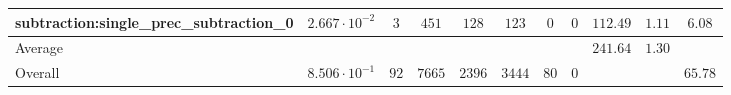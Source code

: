 \begin{tabular}{|l|c|c|c|c|c|c|c|c|c|c|}
subtraction:single\_prec\_subtraction\_0         & $ 2.667 \cdot 10^{-2} $ & $ 3      $ & $ 451  $ & $ 128  $ & $ 123   $ & $ 0  $ & $ 0 $ & $ 112.49      $ & $ 1.11    $ & $ 6.08    $ \\
\hline
Average                                          & $                     $ & $        $ & $      $ & $      $ & $       $ & $    $ & $   $ & $ 241.64      $ & $ 1.30    $ & $         $ \\
\hline
Overall                                          & $ 8.506 \cdot 10^{-1} $ & $ 92     $ & $ 7665 $ & $ 2396 $ & $ 3444  $ & $ 80 $ & $ 0 $ & $             $ & $         $ & $ 65.78   $ \\
\hline
\end{tabular}
